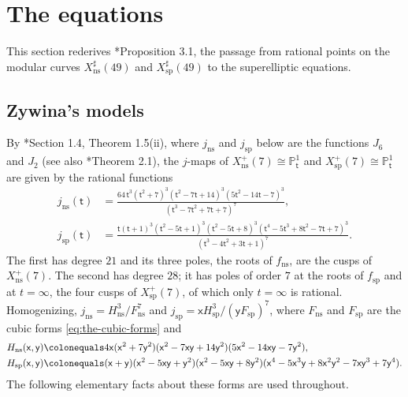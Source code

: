 \documentclass[12pt]{amsart}
\renewcommand{\P}{\mathbb{P}}
\newcommand{\Pone}{\P^{1}}
\newcommand{\x}{\mathsf{x}}
\newcommand{\y}{\mathsf{y}}
\renewcommand{\t}{\mathsf{t}}
\DeclareMathOperator{\ns}{ns}
\DeclareMathOperator{\spc}{sp}
\numberwithin{equation}{section}
\theoremstyle{definition}
\begin{document}
\section{The equations}
\label{sec:equations}

This section rederives \cite{Furio--Lombardo26}*{Proposition 3.1}, the passage from
rational points on the modular curves
$X_{\ns}^{\sharp}(49)$ and $X_{\spc}^{\sharp}(49)$ to the superelliptic equations.

\subsection{Zywina's models}
By \cite{Zywina-15}*{Section 1.4, Theorem 1.5(ii)}, where $j_{\ns}$ and
$j_{\spc}$ below are the functions $J_6$ and $J_2$ (see also
\cite{Furio--Lombardo26}*{Theorem 2.1}), the $j$-maps of $X_{\ns}^{+}(7) \cong \Pone_{\t}$ and
$X_{\spc}^{+}(7) \cong \Pone_{\t}$ are given by the rational functions
\begin{align}
  \label{eq:jns}
  j_{\ns}(\t) &= \frac{64\,\t^{3}(\t^{2}+7)^{3}(\t^{2}-7\t+14)^{3}(5\t^{2}-14\t-7)^{3}}
               {(\t^{3}-7\t^{2}+7\t+7)^{7}}, \\
  \label{eq:jsp}
  j_{\spc}(\t) &= \frac{\t(\t+1)^{3}(\t^{2}-5\t+1)^{3}(\t^{2}-5\t+8)^{3}
                 (\t^{4}-5\t^{3}+8\t^{2}-7\t+7)^{3}}
               {(\t^{3}-4\t^{2}+3\t+1)^{7}} .
\end{align}
The first has degree $21$ and its three poles, the roots of
$f_{\ns}$, are the cusps of $X_{\ns}^{+}(7)$. The second has degree $28$; it has
poles of order $7$ at the roots of $f_{\spc}$ and at $t = \infty$, the four
cusps of $X_{\spc}^{+}(7)$, of which only $t = \infty$ is rational.
Homogenizing, $j_{\ns} = H_{\ns}^{3}/F_{\ns}^{7}$ and $j_{\spc} = \x
H_{\spc}^{3}/(\y F_{\spc})^{7}$, where $F_{\ns}$ and $F_{\spc}$ are the cubic
forms \eqref{eq:the-cubic-forms} and
\begin{align*}
  H_{\ns}(\x,\y) &\colonequals 4\x(\x^{2}+7\y^{2})(\x^{2}-7\x\y+14\y^{2})(5\x^{2}-14\x\y-7\y^{2}), \\
  H_{\spc}(\x,\y) &\colonequals (\x+\y)(\x^{2}-5\x\y+\y^{2})(\x^{2}-5\x\y+8\y^{2})
                   (\x^{4}-5\x^{3}\y+8\x^{2}\y^{2}-7\x\y^{3}+7\y^{4}) .
\end{align*}
The following elementary facts about these forms are used throughout.
\end{document}
